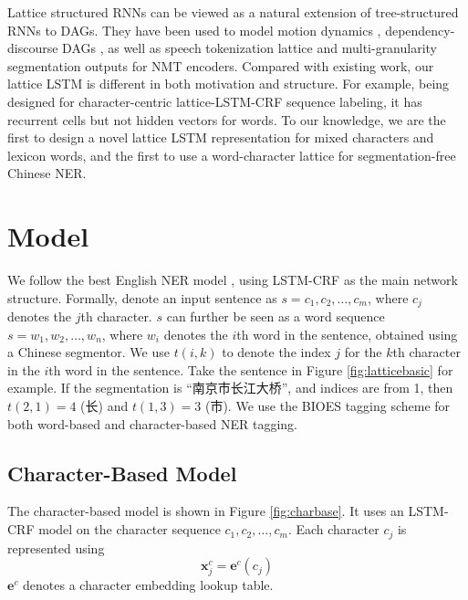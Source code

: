 \documentclass[11pt,a4paper]{article}
\begin{document}
\begin{CJK*}{UTF8}{gbsn}
Lattice structured RNNs can be viewed as a natural extension of tree-structured RNNs \cite{tai-socher-manning:2015:ACL-IJCNLP} to DAGs. They have been used to model motion dynamics \cite{Sun_2017_ICCV}, dependency-discourse DAGs \cite{DBLP:journals/tacl/PengPQTY17}, as well as speech tokenization lattice \cite{sperber-EtAl:2017:EMNLP2017} and multi-granularity segmentation outputs \cite{DBLP:conf/aaai/SuTXJSL17} for NMT encoders. Compared with existing work, our lattice LSTM is different in both motivation and structure. For example, being designed for character-centric lattice-LSTM-CRF sequence labeling, it has recurrent cells but not hidden vectors for words. To our knowledge, we are the first to design a novel lattice LSTM representation for mixed characters and lexicon words, and the first to use a word-character lattice for segmentation-free Chinese NER.



\section{Model}

We follow the best English NER model \cite{huang2015bidirectional,ma2016end,lample2016neural}, using LSTM-CRF as the main network structure. Formally, denote an input sentence as $s=c_1,c_2,\ldots,c_m$, where $c_j$ denotes the $j$th character. $s$ can further be seen as a word sequence $s=w_1,w_2,\ldots,w_n$, where $w_i$ denotes the $i$th word in the sentence, obtained using a Chinese segmentor.  We use $t(i, k)$ to denote the index $j$ for the $k$th character in the $i$th word in the sentence. Take the sentence in Figure \ref{fig:latticebasic} for example. If the segmentation is ``南京市\;\;长江大桥'', and indices are from 1, then $t(2, 1)=4$ (长) and $t(1, 3)=3$ (市). We use the BIOES tagging scheme \cite{ratinov2009design} for both word-based and character-based NER tagging.



\subsection{Character-Based Model}\label{sec:charmodel}
The character-based model is shown in Figure \ref{fig:charbase}. It uses an LSTM-CRF model on the character sequence $c_1,c_2,\ldots,c_m$. Each character $c_j$ is represented using
\begin{equation}
\textbf{x}^c_j = \textbf{e}^c(c_j)
\end{equation}
$\textbf{e}^c$ denotes a character embedding lookup table. 


\end{CJK*}
\end{document}
